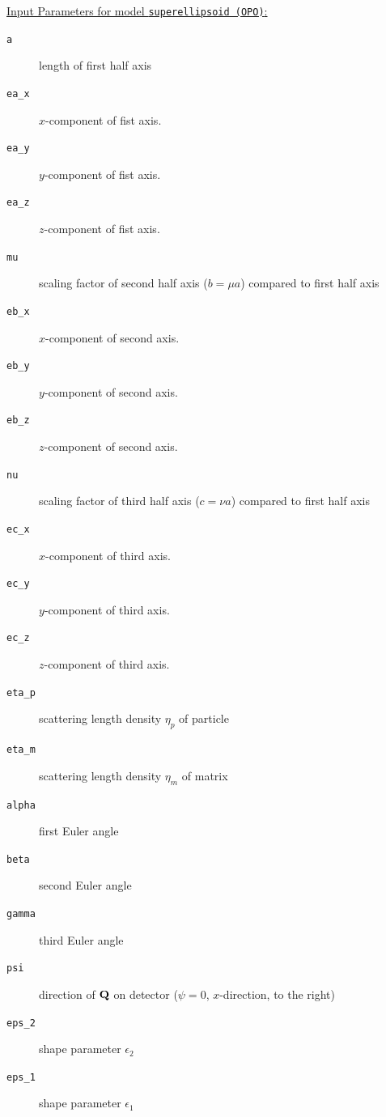 \uline{Input Parameters for model \texttt{superellipsoid (OPO)}:}
\begin{description}
\item[\texttt{a}] length of first half axis
\item[\texttt{ea\_x}] $x$-component of fist axis.
\item[\texttt{ea\_y}] $y$-component of fist axis.
\item[\texttt{ea\_z}] $z$-component of fist axis.
\item[\texttt{mu}] scaling factor of second half axis ($b=\mu a$) compared to first half axis
\item[\texttt{eb\_x}] $x$-component of second axis.
\item[\texttt{eb\_y}] $y$-component of second axis.
\item[\texttt{eb\_z}] $z$-component of second axis.
\item[\texttt{nu}] scaling factor of third half axis ($c=\nu a$) compared to first half axis
\item[\texttt{ec\_x}] $x$-component of third axis.
\item[\texttt{ec\_y}] $y$-component of third axis.
\item[\texttt{ec\_z}] $z$-component of third axis.
\item[\texttt{eta\_p}] scattering length density $\eta_p$ of particle
\item[\texttt{eta\_m}] scattering length density $\eta_m$ of matrix
\item[\texttt{alpha}] first Euler angle
\item[\texttt{beta}] second Euler angle
\item[\texttt{gamma}] third Euler angle
\item[\texttt{psi}] direction of ${\bf Q}$ on detector ($\psi=0$, $x$-direction, to the right)
\item[\texttt{eps\_2}] shape parameter $\epsilon_2$
\item[\texttt{eps\_1}] shape parameter $\epsilon_1$
\end{description}

